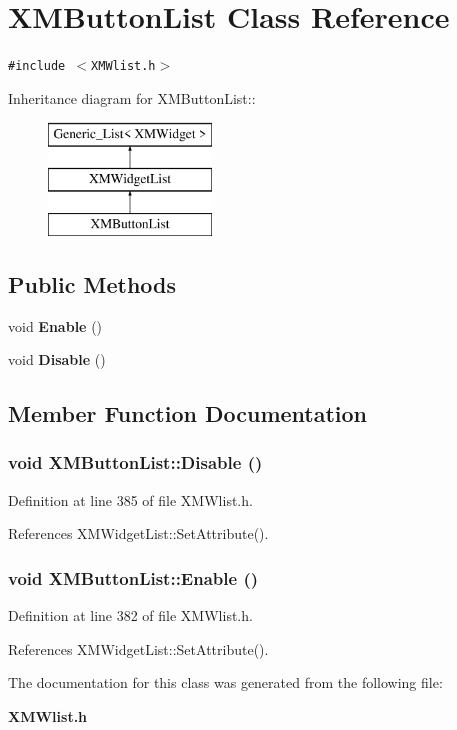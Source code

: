 \section{XMButton\-List  Class Reference}
\label{classXMButtonList}
{\tt \#include $<$XMWlist.h$>$}

Inheritance diagram for XMButton\-List::\begin{figure}[H]
\begin{center}
\leavevmode
\includegraphics[height=3cm]{classXMButtonList}
\end{center}
\end{figure}
\subsection*{Public Methods}
\begin{CompactItemize}
\item 
void {\bf Enable} ()
\item 
void {\bf Disable} ()
\end{CompactItemize}


\subsection{Member Function Documentation}
\subsubsection{\setlength{\rightskip}{0pt plus 5cm}void XMButton\-List::Disable ()\hspace{0.3cm}{\tt  [inline]}}\label{classXMButtonList_a1}




Definition at line 385 of file XMWlist.h.

References XMWidget\-List::Set\-Attribute().
\subsubsection{\setlength{\rightskip}{0pt plus 5cm}void XMButton\-List::Enable ()\hspace{0.3cm}{\tt  [inline]}}\label{classXMButtonList_a0}




Definition at line 382 of file XMWlist.h.

References XMWidget\-List::Set\-Attribute().

The documentation for this class was generated from the following file:\begin{CompactItemize}
\item 
{\bf XMWlist.h}\end{CompactItemize}
